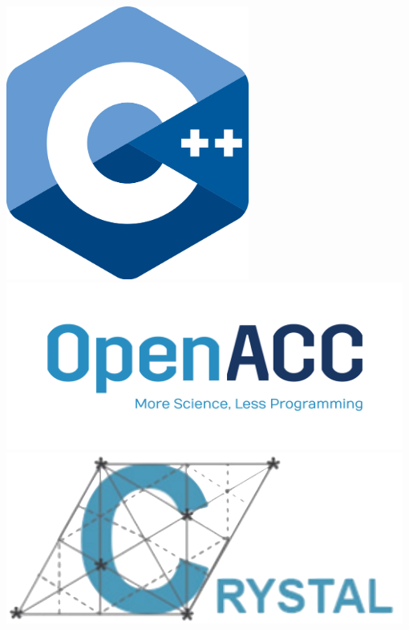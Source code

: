\documentclass[dvisvgm,11pt,aspectratio=169]{beamer}
\begin{document}
\begin{frame}
\begin{columns}
\begin{column}{0.2\textwidth}
	\includegraphics[width=0.6\textwidth]{img/cpp}	\\
	\vspace{1cm}		
	\includegraphics[width=0.98\textwidth]{img/openacc}\\
	\vspace{1cm}
	\includegraphics[width=0.98\textwidth]{img/cry}

	\end{column}
\end{columns}
\end{frame}
\end{document}

